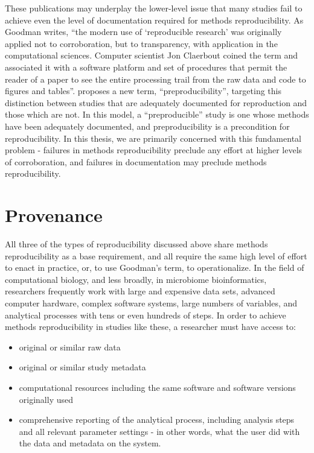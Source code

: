 These publications may underplay the lower-level issue that many studies
fail to achieve even the level of documentation required for methods
reproducibility. As Goodman writes, “the modern use of ‘reproducible research’
was originally applied not to corroboration, but to transparency, with
application in the computational sciences. Computer scientist Jon Claerbout
coined the term and associated it with a software platform and set of procedures
that permit the reader of a paper to see the entire processing trail from the
raw data and code to figures and tables”\parencite[1]{goodman_what_2016}.
\textcite{stark_before_2018} proposes a new term,
“preproducibility”, targeting this distinction between studies that are
adequately documented for reproduction and those which are not. In this
model, a “preproducible” study is one whose methods have been adequately
documented, and preproducibility is a precondition for reproducibility. In this
thesis, we are primarily concerned with this fundamental problem - failures in
methods reproducibility preclude any effort at higher levels of corroboration,
and failures in documentation may preclude methods reproducibility.

\section{Provenance}

All three of the types of reproducibility discussed above share methods
reproducibility as a base requirement, and all require the same high level of
effort to enact in practice, or, to use Goodman’s term, to operationalize. In
the field of computational biology, and less broadly, in microbiome
bioinformatics, researchers frequently work with large and expensive data sets,
advanced computer hardware, complex software systems, large numbers of
variables, and analytical processes with tens or even hundreds of steps. In
order to achieve methods reproducibility in studies like these, a researcher
must have access to:

\begin{itemize}
    \item original or similar raw data
    \item original or similar study metadata
    \item computational resources including the same software and software versions originally used
    \item comprehensive reporting of the analytical process, including analysis steps and all relevant parameter settings - in other words, what the user did with the data and metadata on the system.
\end{itemize}

